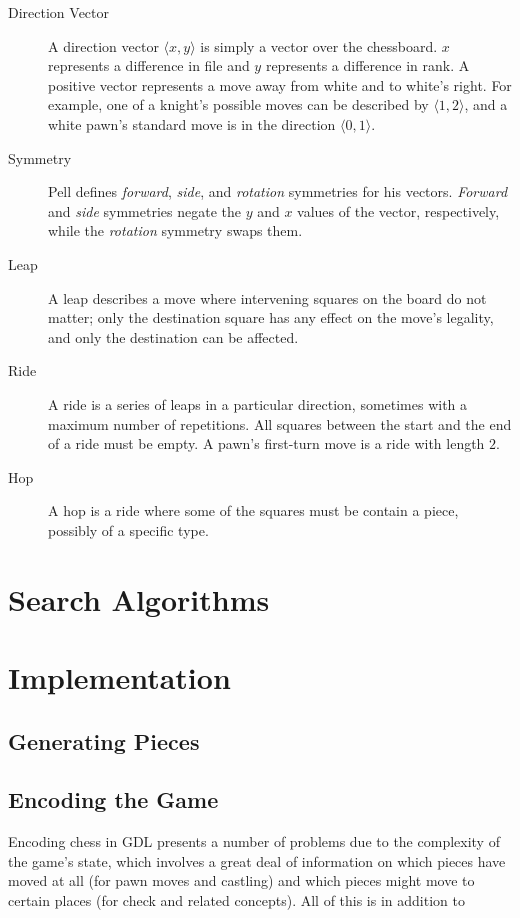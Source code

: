 \documentclass[11pt,letterpaper]{article}
\begin{document}
\begin{description}
   \item [Direction Vector] A direction vector \(\langle x,y \rangle\) is simply
      a vector over the chessboard. \(x\) represents a difference in file and
      \(y\) represents a difference in rank. A positive vector represents a move
      away from white and to white's right. For example, one of a knight's
      possible moves can be described by \(\langle 1,2 \rangle\), and a white
      pawn's standard move is in the direction \(\langle 0,1 \rangle\).
   \item [Symmetry] Pell defines \textit{forward}, \textit{side}, and
      \textit{rotation} symmetries for his vectors. \textit{Forward} and
      \textit{side} symmetries negate the \(y\) and \(x\) values of the vector,
      respectively, while the \textit{rotation} symmetry swaps them.
   \item [Leap] A leap describes a move where intervening squares on the board
      do not matter; only the destination square has any effect on the move's
      legality, and only the destination can be affected.
   \item [Ride] A ride is a series of leaps in a particular direction, sometimes
      with a maximum number of repetitions. All squares between the start and
      the end of a ride must be empty. A pawn's first-turn move is a ride with
      length \(2\).
   \item [Hop] A hop is a ride where some of the squares must be contain a
      piece, possibly of a specific type.
\end{description}

\section{Search Algorithms}

\section{Implementation}
\subsection{Generating Pieces}

\subsection{Encoding the Game}
Encoding chess in GDL presents a number of problems due to the complexity of the
game's state, which involves a great deal of information on which pieces have
moved at all (for pawn moves and castling) and which pieces might move to
certain places (for check and related concepts). All of this is in addition to 
\end{document}
